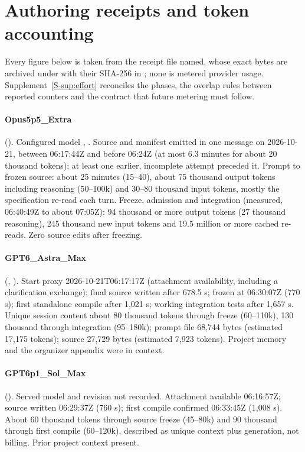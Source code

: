 \section{Authoring receipts and token accounting}
\label{app:receipts}

Every figure below is taken from the receipt file named, whose exact bytes are archived under
 with their SHA-256 in ; none is
metered provider usage. Supplement~\ref{S-sup:effort} reconciles the phases, the overlap rules
between reported counters and the contract that future metering must follow.

\paragraph{Opus5p5\_Extra} (). Configured model
, . Source and manifest emitted in one message on
2026-10-21, between 06:17:44Z and before 06:24Z (at most 6.3 minutes for about 20 thousand tokens);
at least one earlier, incomplete attempt preceded it. Prompt to frozen source: about 25 minutes
(15--40), about 75 thousand output tokens including reasoning (50--100k) and 30--80 thousand input
tokens, mostly the specification re-read each turn. Freeze, admission and integration (measured,
06:40:49Z to about 07:05Z): 94 thousand or more output tokens (27 thousand reasoning), 245 thousand
new input tokens and 19.5 million or more cached re-reads. Zero source edits after freezing.

\paragraph{GPT6\_Astra\_Max} (,
). Start proxy 2026-10-21T06:17:17Z (attachment availability, including a
clarification exchange); final source written after 678.5 s; frozen at 06:30:07Z (770 s); first
standalone compile after 1,021 s; working integration tests after 1,657 s. Unique session content
about 80 thousand tokens through freeze (60--110k), 130 thousand through integration (95--180k);
prompt file 68,744 bytes (estimated 17,175 tokens); source 27,729 bytes (estimated 7,923 tokens).
Project memory and the organizer appendix were in context.

\paragraph{GPT6p1\_Sol\_Max} ().
Served model and revision not recorded. Attachment available 06:16:57Z; source written 06:29:37Z
(760 s); first compile confirmed 06:33:45Z (1,008 s). About 60 thousand tokens through source freeze
(45--80k) and 90 thousand through first compile (60--120k), described as unique context plus
generation, not billing. Prior project context present.

